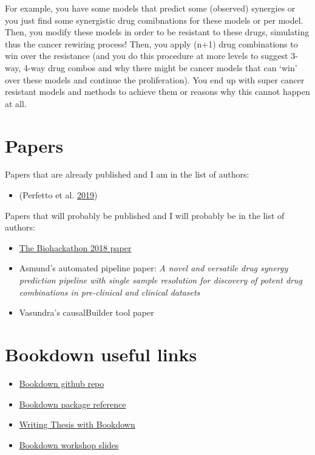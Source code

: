 \documentclass[12pt,]{book}
\providecommand{\tightlist}{%
  \setlength{\itemsep}{0pt}\setlength{\parskip}{0pt}}
\begin{document}
For example, you have some models that predict some (observed) synergies or you
just find some synergistic drug comibnations for these models or per model.
Then, you modify these models in order to be resistant to these drugs, simulating
thus the cancer rewiring process! Then, you apply (n+1) drug combinations to
win over the resistance (and you do this procedure at more levels to suggest
3-way, 4-way drug combos and why there might be cancer models that can `win'
over these models and continue the proliferation). You end up with super cancer
resistant models and methods to achieve them or reasons why this cannot happen
at all.

\hypertarget{appendix-appendix}{%
\appendix}


\hypertarget{papers-1}{%
\chapter*{Papers}\label{papers-1}}

Papers that are already published and I am in the list of authors:

\begin{itemize}
\tightlist
\item
  (Perfetto et al. \protect\hyperlink{ref-Perfetto2019}{2019})
\end{itemize}

Papers that will probably be published and I will probably be in the list of authors:

\begin{itemize}
\tightlist
\item
  \href{https://www.tinyurl.com/bh2018write}{The Biohackathon 2018 paper}
\item
  Asmund's automated pipeline paper: \emph{A novel and versatile drug synergy prediction pipeline with single sample resolution for discovery of potent drug combinations in pre-clinical and clinical datasets}
\item
  Vasundra's causalBuilder tool paper
\end{itemize}

\hypertarget{bookdown-useful-links}{%
\chapter*{Bookdown useful links}\label{bookdown-useful-links}}

\begin{itemize}
\tightlist
\item
  \href{https://github.com/rstudio/bookdown/}{Bookdown github repo}
\item
  \href{https://bookdown.org/yihui/bookdown/}{Bookdown package reference}
\item
  \href{https://eddjberry.netlify.com/post/writing-your-thesis-with-bookdown/}{Writing Thesis with Bookdown}
\item
  \href{https://arm.rbind.io/slides/bookdown.html}{Bookdown workshop slides}
\end{itemize}
\end{document}
